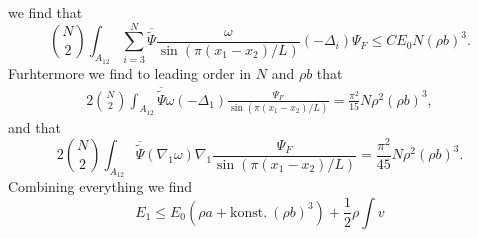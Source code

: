 \documentclass[a4paper,11pt]{article}
\numberwithin{equation}{section}
\begin{document}
	we find that \begin{equation}
	\binom{N}{2}\int_{A_{12}}\sum_{i=3}^{N} \overline{\tilde{\Psi}}\frac{\omega}{\sin(\pi(x_1-x_2)/L)}(-\Delta_i)\Psi_F\leq C E_0 N(\rho b)^3.
	\end{equation}
	Furhtermore we find to leading order in $ N $ and $ \rho b $ that \begin{equation}
	\begin{aligned}
	2\binom{N}{2}\int_{A_{12}}\overline{\tilde{\Psi}}\omega(-\Delta_1)\frac{\Psi_F}{\sin(\pi(x_1-x_2)/L)}=\frac{\pi^2}{15}N\rho^2 (\rho b)^3,
	\end{aligned}
	\end{equation}
	and that \begin{equation}
	2\binom{N}{2}\int_{A_{12}}\overline{\tilde{\Psi}}(\nabla_1\omega)\nabla_1\frac{\Psi_F}{\sin(\pi(x_1-x_2)/L)}=\frac{\pi^2}{45}N\rho^2(\rho b)^3.
	\end{equation}
	Combining everything we find \begin{equation}
	E_1\leq E_0 \left(\rho a+ \text{konst.}\ (\rho b)^3\right)+\frac{1}{2}\rho \int v
	\end{equation}
\end{document}
